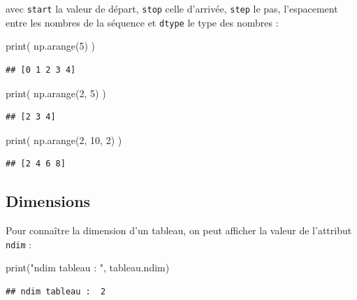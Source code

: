 \documentclass[
  12pt,
]{book}
\newenvironment{Shaded}{\begin{snugshade}}{\end{snugshade}}
\newcommand{\BuiltInTok}[1]{#1}
\newcommand{\DecValTok}[1]{\textcolor[rgb]{0.00,0.00,0.81}{#1}}
\newcommand{\NormalTok}[1]{#1}
\newcommand{\StringTok}[1]{\textcolor[rgb]{0.31,0.60,0.02}{#1}}
\numberwithin{equation}{section}
\numberwithin{countremarque}{section}
\begin{document}
avec \texttt{start} la valeur de départ, \texttt{stop} celle d'arrivée, \texttt{step} le pas, l'espacement entre les nombres de la séquence et \texttt{dtype} le type des nombres :

\begin{Shaded}
\begin{Highlighting}[]
\BuiltInTok{print}\NormalTok{( np.arange(}\DecValTok{5}\NormalTok{) )}
\end{Highlighting}
\end{Shaded}

\begin{lstlisting}
## [0 1 2 3 4]
\end{lstlisting}

\begin{Shaded}
\begin{Highlighting}[]
\BuiltInTok{print}\NormalTok{( np.arange(}\DecValTok{2}\NormalTok{, }\DecValTok{5}\NormalTok{) )}
\end{Highlighting}
\end{Shaded}

\begin{lstlisting}
## [2 3 4]
\end{lstlisting}

\begin{Shaded}
\begin{Highlighting}[]
\BuiltInTok{print}\NormalTok{( np.arange(}\DecValTok{2}\NormalTok{, }\DecValTok{10}\NormalTok{, }\DecValTok{2}\NormalTok{) )}
\end{Highlighting}
\end{Shaded}

\begin{lstlisting}
## [2 4 6 8]
\end{lstlisting}

\subsection{Dimensions}\label{dimensions}

Pour connaître la dimension d'un tableau, on peut afficher la valeur de l'attribut \texttt{ndim} :

\begin{Shaded}
\begin{Highlighting}[]
\BuiltInTok{print}\NormalTok{(}\StringTok{"ndim tableau : "}\NormalTok{, tableau.ndim)}
\end{Highlighting}
\end{Shaded}

\begin{lstlisting}
## ndim tableau :  2
\end{lstlisting}
\end{document}
